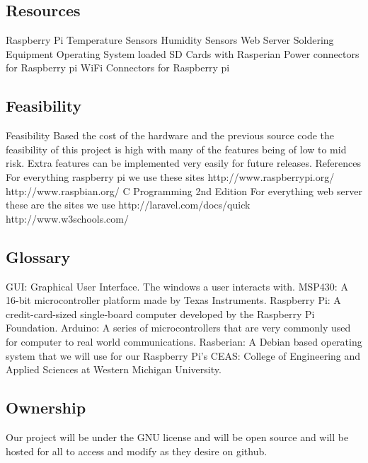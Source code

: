 \documentclass{report}
\begin{document}
\subsection*{Resources}
Raspberry Pi
Temperature Sensors
Humidity Sensors
Web Server
Soldering Equipment
Operating System loaded SD Cards with Rasperian
Power connectors for Raspberry pi
WiFi Connectors for Raspberry pi
\newpage
\subsection*{Feasibility}
Feasibility
	Based the cost of the hardware and the previous source code the feasibility of this project is high with many of the features being of low to mid risk. Extra features can be implemented very easily for future releases.
References
	For everything raspberry pi we use these sites
http://www.raspberrypi.org/
http://www.raspbian.org/
C Programming 2nd Edition
For everything web server these are the sites we use
	http://laravel.com/docs/quick
http://www.w3schools.com/
\newpage
\subsection*{Glossary}
GUI: Graphical User Interface. The windows a user interacts with.
MSP430: A 16-bit microcontroller platform made by Texas Instruments.
Raspberry Pi: A credit-card-sized single-board computer developed by the Raspberry Pi Foundation.
Arduino: A series of microcontrollers that are very commonly used for computer to real world communications.
Rasberian: A Debian based operating system that we will use for our Raspberry Pi’s
CEAS: College of Engineering and Applied Sciences at Western Michigan University.
\newpage
\subsection*{Ownership}
	Our project will be under the GNU license and will be open source and will be hosted for all to access and modify as they desire on github.
\end{document}
